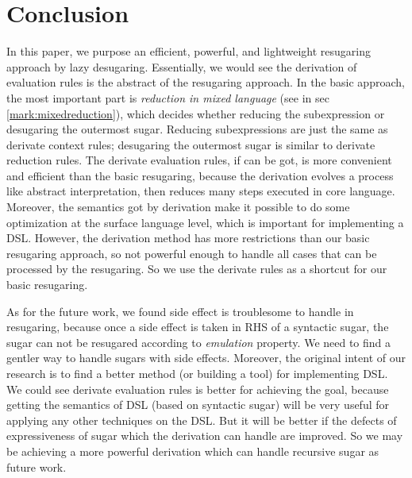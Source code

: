\section{Conclusion}
\label{sec7}


In this paper, we purpose an efficient, powerful, and lightweight resugaring approach by lazy desugaring. Essentially, we would see the derivation of evaluation rules is the abstract of the resugaring approach. In the basic approach, the most important part is \emph{reduction in mixed language} (see in sec \ref{mark:mixedreduction}), which decides whether reducing the subexpression or desugaring the outermost sugar. Reducing subexpressions are just the same as derivate context rules; desugaring the outermost sugar is similar to derivate reduction rules. The derivate evaluation rules, if can be got, is more convenient and efficient than the basic resugaring, because the derivation evolves a process like abstract interpretation\cite{AbstractInterpretation}, then reduces many steps executed in core language. Moreover, the semantics got by derivation make it possible to do some optimization at the surface language level, which is important for implementing a DSL. However, the derivation method has more restrictions than our basic resugaring approach, so not powerful enough to handle all cases that can be processed by the resugaring. So we use the derivate rules as a shortcut for our basic resugaring.

As for the future work, we found side effect is troublesome to handle in resugaring, because once a side effect is taken in RHS of a syntactic sugar, the sugar can not be resugared according to \emph{emulation} property. We need to find a gentler way to handle sugars with side effects. Moreover,
the original intent of our research is to find a better method (or building a tool) for implementing DSL. We could see derivate evaluation rules is better for achieving the goal, because getting the semantics of DSL (based on syntactic sugar) will be very useful for applying any other techniques on the DSL. But it will be better if the defects of expressiveness of sugar which the derivation can handle are improved. So we may be achieving a more powerful derivation which can handle recursive sugar as future work.
